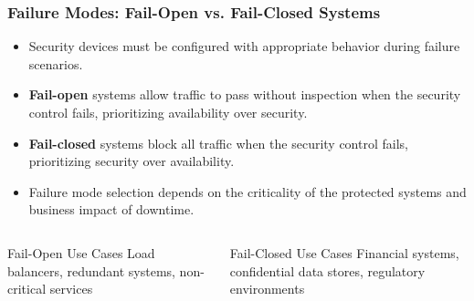 \documentclass{beamer}
\begin{document}
\begin{frame}
    \frametitle{Failure Modes: Fail-Open vs. Fail-Closed Systems}
    \begin{itemize}
        \item Security devices must be configured with appropriate behavior during failure scenarios.
        \item \textbf{Fail-open} systems allow traffic to pass without inspection when the security control fails, prioritizing availability over security.
        \item \textbf{Fail-closed} systems block all traffic when the security control fails, prioritizing security over availability.
        \item Failure mode selection depends on the criticality of the protected systems and business impact of downtime.
    \end{itemize}
    
    \begin{columns}
        \begin{column}{0.48\textwidth}
            \begin{block}{Fail-Open Use Cases}
                Load balancers, redundant systems, non-critical services
            \end{block}
        \end{column}
        \begin{column}{0.48\textwidth}
            \begin{block}{Fail-Closed Use Cases}
                Financial systems, confidential data stores, regulatory environments
            \end{block}
        \end{column}
    \end{columns}
\end{frame}
\end{document}
